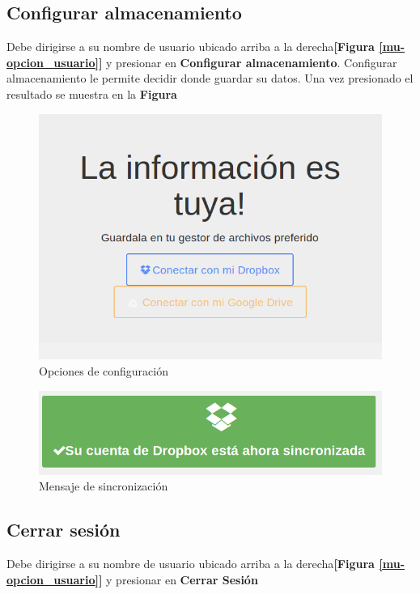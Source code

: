 \subsection{Configurar almacenamiento}
Debe dirigirse a su nombre de usuario ubicado arriba a la derecha\textbf{[Figura \ref{mu-opcion_usuario}]} y presionar en \textbf{Configurar almacenamiento}. Configurar almacenamiento le permite decidir donde guardar su datos. Una vez presionado el resultado se muestra en la \textbf{Figura}

\begin{figure}
	\centering
	\includegraphics[width=.8\textwidth]{img/manual_de_usuario/configurar_almacenamiento}
	\caption{Opciones de configuración}
	\label{mu-configurar_almacenamiento}
\end{figure}
\begin{figure}
	\centering
	\includegraphics[width=.8\textwidth]{img/manual_de_usuario/cuenta_sincronizada}
	\caption{Mensaje de sincronización}
	\label{mu-cuenta_sincronizada}
\end{figure}
\subsection{Cerrar sesión}
Debe dirigirse a su nombre de usuario ubicado arriba a la derecha\textbf{[Figura \ref{mu-opcion_usuario}]} y presionar en \textbf{Cerrar Sesión}




\stopcontents
